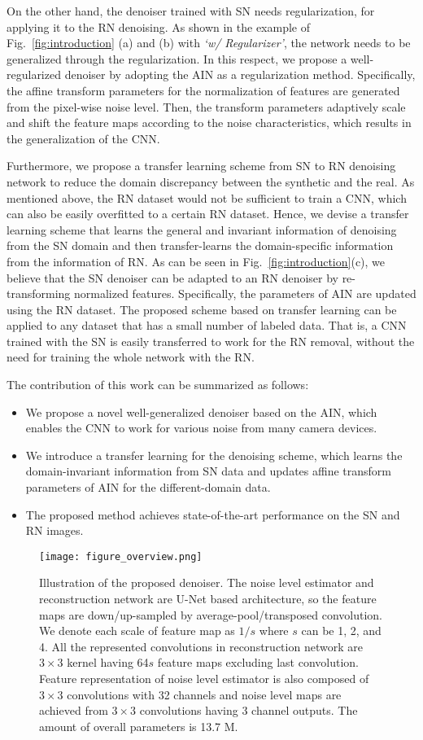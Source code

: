 \documentclass[10pt,twocolumn,letterpaper]{article}
\begin{document}
On the other hand, the denoiser trained with SN needs regularization, for applying it to the RN denoising. As shown in the example of Fig.~\ref{fig:introduction} (a) and (b) with \textit{`w/ Regularizer'}, the network needs to be generalized through the regularization.
In this respect, we propose a well-regularized denoiser by adopting the AIN as a regularization method.
Specifically, the affine transform parameters for the normalization of features are generated from the pixel-wise noise level. Then, the transform parameters adaptively scale and shift the feature maps according to the noise characteristics, which results in the generalization of the CNN.

Furthermore, we propose a transfer learning scheme from SN to RN denoising network to reduce the domain discrepancy between the synthetic and the real.
As mentioned above, the RN dataset would not be sufficient to train a CNN, which can also be easily overfitted to a certain RN dataset.
Hence, we devise a transfer learning scheme that learns the general and invariant information of denoising from the SN domain and then transfer-learns the domain-specific information from the information of RN.
As can be seen in Fig.~\ref{fig:introduction}(c), we believe that the SN denoiser can be adapted to an RN denoiser by re-transforming normalized features.
Specifically, the parameters of AIN are updated using the RN dataset. The proposed scheme based on transfer learning can be applied to any dataset that has a small number of labeled data. That is, a CNN trained with the SN is easily transferred to work for the RN removal, without the need for training the whole network with the RN.

The contribution of this work can be summarized as follows:
\begin{itemize}
	\item We propose a novel well-generalized denoiser based on the AIN, which enables the CNN to work for various noise from many camera devices.	
	\item We introduce a transfer learning for the denoising scheme, which learns the domain-invariant information from SN data and updates affine transform parameters of AIN for the different-domain data.
	\item The proposed method achieves state-of-the-art performance on the SN and RN images.	
\end{itemize}
\begin{figure*}[t]
	\centering				
	\texttt{[image: figure\_overview.png]} 
	\caption{
		Illustration of the proposed denoiser. 
		The noise level estimator and reconstruction network are U-Net based architecture, so the feature maps are down/up-sampled by average-pool/transposed convolution. We denote each scale of feature map as $1/s$ where $s$ can be 1, 2, and 4. All the represented convolutions in reconstruction network are $3\times3$ kernel having 64$s$ feature maps excluding last convolution.  Feature representation of noise level estimator is also composed of $3\times3$ convolutions with 32 channels and noise level maps are achieved from $3\times3$ convolutions having 3 channel outputs. 
		The amount of overall parameters is 13.7 M.
	}			
	\label{fig:overview}	
\end{figure*}
\end{document}
